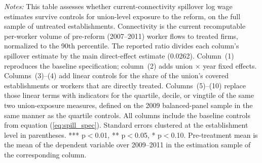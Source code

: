 \begin{table}[H]
\begin{minipage}{\linewidth}
    \scriptsize\vspace{4pt}
    \textit{Notes:} This table assesses whether current-connectivity spillover log wage estimates survive controls for union-level exposure to the reform, on the full sample of untreated establishments. Connectivity is the current recomputable per-worker volume of pre-reform (2007--2011) worker flows to treated firms, normalized to the 90th percentile. The reported ratio divides each column's spillover estimate by the main direct-effect estimate (0.0262). Column~(1) reproduces the baseline specification; column~(2) adds union $\times$ year fixed effects. Columns~(3)--(4) add linear controls for the share of the union's covered establishments or workers that are directly treated. Columns~(5)--(10) replace those linear terms with indicators for the quartile, decile, or vingtile of the same two union-exposure measures, defined on the 2009 balanced-panel sample in the same manner as the quartile controls. All columns include the baseline controls from equation (\ref{eq:spill_spec}). Standard errors clustered at the establishment level in parentheses. *** p$<$0.01, ** p$<$0.05, * p$<$0.10. Pre-treatment mean is the mean of the dependent variable over 2009--2011 in the estimation sample of the corresponding column.
\end{minipage}
\footnotesize
\end{table}
